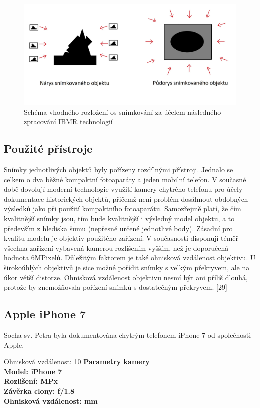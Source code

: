 \documentclass[a4paper, 12pt]{report}
\begin{document}
\begin{figure}[h!]
	\centering
	\includegraphics[width=16cm]{snímkování.jpg}
	\caption{Schéma vhodného rozložení os snímkování za účelem následného zpracování IBMR technologií}
\end{figure}

\subsection{Použité přístroje}
Snímky jednotlivých objektů byly pořízeny rozdílnými přístroji. Jednalo se celkem o dva běžné kompaktní fotoaparáty a jeden mobilní telefon. V současné době dovolují moderní technologie využití kamery chytrého telefonu pro účely dokumentace historických objektů, přičemž není problém dosáhnout obdobných výsledků jako při použití kompaktního fotoaparátu. Samozřejmě platí, že čím kvalitnější snímky jsou, tím bude kvalitnější i výsledný model objektu, a to především z hlediska šumu (nepřesně určené jednotlivé body). Zásadní pro kvalitu modelu je objektiv použitého zařízení. V současnosti disponují téměř všechna zařízení vybavená kamerou rozlišením vyšším, než je doporučená hodnota 6MPixelů. Důležitým faktorem je také ohnisková vzdálenost objektivu. U širokoúhlých objektivů je sice možné pořídit snímky s velkým překryvem, ale na úkor větší distorze. Ohnisková vzdálenost objektivu nesmí být ani příliš dlouhá, protože by znemožňovala pořízení snímků s dostatečným překryvem. [29]

\subsection*{Apple iPhone 7}
Socha sv. Petra byla dokumentována chytrým telefonem iPhone 7 od společnosti Apple. 

\begin{tabbing}
    Ohnisková vzdálenost: \=      
    \= 10 \kill
    \bfseries Parametry kamery \> \\[1mm]
    Model:	\>	iPhone 7\\
    Rozlišení:	 MPx\\
    Závěrka clony:	\>	f/1.8\\
    Ohnisková vzdálenost:	 mm\\
\end{tabbing}
\end{document}
